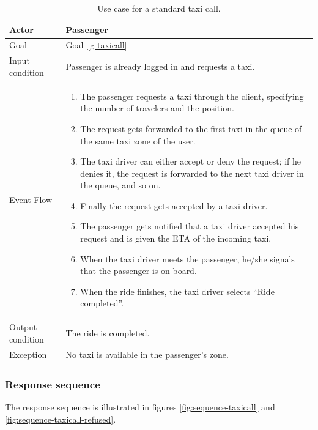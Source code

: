 \begin{table}
\begin{center}
\begin{tabular}{| l | p{} |}
\hline
Actor & Passenger \\
\hline
Goal & Goal~\ref{g-taxicall}
\\
\hline
Input condition & Passenger is already logged in and requests a taxi.  \\
\hline
Event Flow & \begin{enumerate}
	\item The passenger requests a taxi through the client, specifying the number of travelers and the position.
	\item The request gets forwarded to the first taxi in the queue of the same taxi zone of the user.
	\item The taxi driver can either accept or deny the request; if he denies it, the request is forwarded to the next taxi driver in the queue, and so on.
	\item Finally the request gets accepted by a taxi driver.
	\item The passenger gets notified that a taxi driver accepted his request and is given the ETA of the incoming taxi.
	\item When the taxi driver meets the passenger, he/she signals that the passenger is on board.
	\item When the ride finishes, the taxi driver selects ``Ride completed''.
\end{enumerate}
\\
\hline
Output condition & The ride is completed. \\
\hline
Exception & No taxi is available in the passenger's zone. \\
\hline
\end{tabular}
\end{center}
\caption{Use case for a standard taxi call.}
\label{usecase-taxicall}
\end{table}

\subsubsection{Response sequence}
The response sequence is illustrated in figures \ref{fig:sequence-taxicall} and \ref{fig:sequence-taxicall-refused}.

